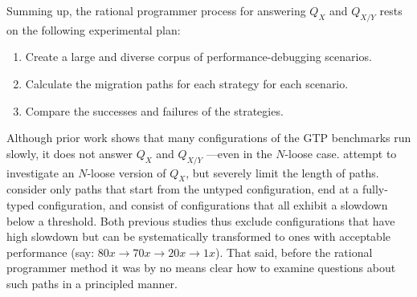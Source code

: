 Summing up, the rational programmer process for answering $Q_X$ and $Q_{X/Y}$ rests on the following
experimental plan:
\begin{enumerate}

\item Create a large and diverse corpus of performance-debugging scenarios.

\item Calculate the migration paths for each strategy for
  each scenario.

\item Compare the successes and failures of the strategies.

\end{enumerate}

Although prior work shows that many configurations of the GTP benchmarks
run slowly, it does not answer $Q_X$ and $Q_{X/Y}$ 
---even in the $N$-loose case.  \citet{gtnffvf-jfp-2019} attempt to
investigate an $N$-loose version of  $Q_X$, but severely limit the length of paths.
\citet{g-deep-shallow} consider only paths that start from the untyped
configuration, end at a fully-typed configuration, and consist of configurations that 
all exhibit a slowdown below a threshold.  Both previous studies thus exclude
configurations that have high slowdown but can be systematically
transformed to ones with acceptable performance (say: $80x \rightarrow 70x
\rightarrow 20x \rightarrow 1x$). That said, before the rational programmer 
method it was by no means clear how to examine questions about such paths in a
principled manner.
